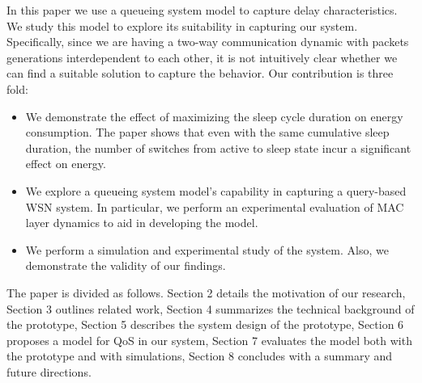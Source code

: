 In this paper we use a queueing system model to capture delay characteristics. We study this model to explore its suitability in capturing our system. Specifically, since we are having a two-way communication dynamic with packets generations interdependent to each other, it is not intuitively clear whether we can find a suitable solution to capture the behavior. Our contribution is three fold:
\begin{itemize}
\item{We demonstrate the effect of maximizing the sleep cycle duration on energy consumption. The paper shows that even with the same cumulative sleep duration, the number of switches from active to sleep state incur a significant effect on energy.}
\item{We explore a queueing system model's capability in capturing a query-based WSN system. In particular, we perform an experimental evaluation of MAC layer dynamics to aid in developing the model.}
\item{We perform a simulation and experimental study of the system. Also, we demonstrate the validity of our findings.}
\end{itemize}

The paper is divided as follows. Section 2 details the motivation of our research, Section 3 outlines related work, Section 4 summarizes the technical background of the prototype, Section 5 describes the system design of the prototype, Section 6 proposes a model for QoS in our system, Section 7 evaluates the model both with the prototype and with simulations, Section 8 concludes with a summary and future directions.
